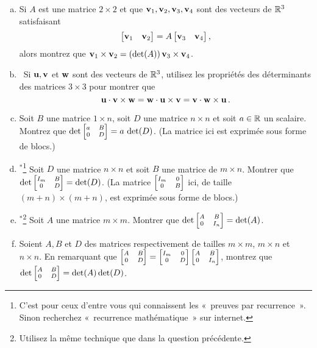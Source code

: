 \begin{prob}
\begin{enumerate}[a)]
\end{enumerate}
\end{prob} \begin{prob} \label{prob21.5}
\medskip
\begin{enumerate}[a)]
\item 
\medskip Si $A$ est une matrice $2\times2$ et que $\mathbf{v}_1, \mathbf{v}_2, \mathbf{v}_3, \mathbf{v}_4$ sont des vecteurs de $\mathbb{R}^3$ satisfaisant $$\bmatrix \vv_1 &\vv_2 \endbmatrix= A  \bmatrix \vv_3 &\vv_4 \endbmatrix,$$ alors montrez que $\mathbf{v}_1\times \mathbf{v}_2 =(\det(A))\, \mathbf{v}_3\times \mathbf{v}_4$.
\medskip

\item\sov~Si $\mathbf{u}, \mathbf{v}$ et $\mathbf{w}$ sont des vecteurs de $\mathbb{R}^3$, utilisez les propriétés des déterminants des matrices $3\times 3$ pour montrer que $$ \mathbf{u}\cdot \mathbf{v}\times \mathbf{w}=  \mathbf{w}\cdot \mathbf{u}\times \mathbf{v}= \mathbf{v}\cdot \mathbf{w}\times \mathbf{u}\,.$$


\item Soit $B$ une matrice $1\times n$, soit $D$ une matrice $n\times n$  et soit $a\in \mathbb{R}$ un scalaire. Montrez que $\det \scriptsize\bmatrix a&B\\0&D\endbmatrix= a\,\det(D)$. (La matrice ici est exprimée sous forme de blocs.)
\medskip

\item$^\ast$\footnote{C'est pour ceux d'entre vous qui connaissent les «~preuves par recurrence~».    Sinon recherchez «~recurrence mathématique~» sur internet.} Soit $D$ une matrice $n\times n$ et soit $B$ une matrice de $m\times n$. Montrer que $\det \scriptsize\bmatrix I_m&B\\0&D\endbmatrix= \det(D)$. (La matrice $\scriptsize\bmatrix I_m&0\\0&B\endbmatrix$ ici,  de taille $(m+n)\times (m+n)$, est exprimée sous forme de blocs.)
\medskip


\item$^\ast$\footnote{Utilisez la même technique que dans la question précédente.} Soit $A$ une matrice $m\times m$. Montrer que $\det \scriptsize\bmatrix A&B\\0&I_n\endbmatrix= \det(A)$. 
\medskip
 
\item Soient $A, B$ et $D$ des matrices respectivement de tailles $m\times m$, $m \times n$ et $n \times n$. En remarquant que $ \scriptsize\bmatrix A&B\\0&D\endbmatrix =\bmatrix I_m&0\\0&D\endbmatrix\bmatrix A&B\\0&I_n\endbmatrix$, montrez que $\det \scriptsize\bmatrix A&B\\0&D\endbmatrix= \det(A) \det(D)$. 
\medskip


\end{enumerate}
\end{prob}
